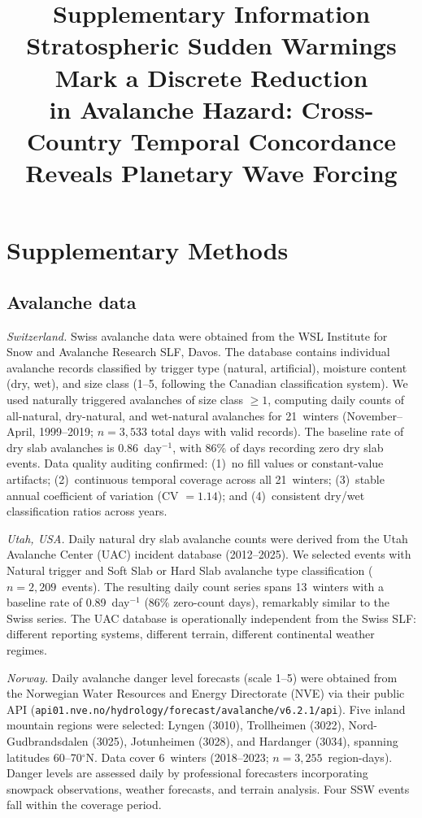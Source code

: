 \documentclass[11pt,a4paper]{article}
\title{\textbf{Supplementary Information}\\[6pt]
Stratospheric Sudden Warmings Mark a Discrete Reduction\\
in Avalanche Hazard: Cross-Country Temporal Concordance\\
Reveals Planetary Wave Forcing}
\author{}
\date{}
\begin{document}
\maketitle

\section{Supplementary Methods}

\subsection{Avalanche data}

\textit{Switzerland.} Swiss avalanche data were obtained from the WSL Institute for Snow and Avalanche Research SLF, Davos. The database contains individual avalanche records classified by trigger type (natural, artificial), moisture content (dry, wet), and size class (1--5, following the Canadian classification system). We used naturally triggered avalanches of size class $\geq 1$, computing daily counts of all-natural, dry-natural, and wet-natural avalanches for 21~winters (November--April, 1999--2019; $n = 3{,}533$ total days with valid records). The baseline rate of dry slab avalanches is 0.86~day$^{-1}$, with 86\% of days recording zero dry slab events. Data quality auditing confirmed: (1)~no fill values or constant-value artifacts; (2)~continuous temporal coverage across all 21~winters; (3)~stable annual coefficient of variation (CV $= 1.14$); and (4)~consistent dry/wet classification ratios across years.

\textit{Utah, USA.} Daily natural dry slab avalanche counts were derived from the Utah Avalanche Center (UAC) incident database (2012--2025). We selected events with Natural trigger and Soft Slab or Hard Slab avalanche type classification ($n = 2{,}209$~events). The resulting daily count series spans 13~winters with a baseline rate of 0.89~day$^{-1}$ (86\% zero-count days), remarkably similar to the Swiss series. The UAC database is operationally independent from the Swiss SLF: different reporting systems, different terrain, different continental weather regimes.

\textit{Norway.} Daily avalanche danger level forecasts (scale 1--5) were obtained from the Norwegian Water Resources and Energy Directorate (NVE) via their public API (\texttt{api01.nve.no/hydrology/forecast/avalanche/v6.2.1/api}). Five inland mountain regions were selected: Lyngen (3010), Trollheimen (3022), Nord-Gudbrandsdalen (3025), Jotunheimen (3028), and Hardanger (3034), spanning latitudes 60--70$^\circ$N. Data cover 6~winters (2018--2023; $n = 3{,}255$~region-days). Danger levels are assessed daily by professional forecasters incorporating snowpack observations, weather forecasts, and terrain analysis. Four SSW events fall within the coverage period.
\end{document}
